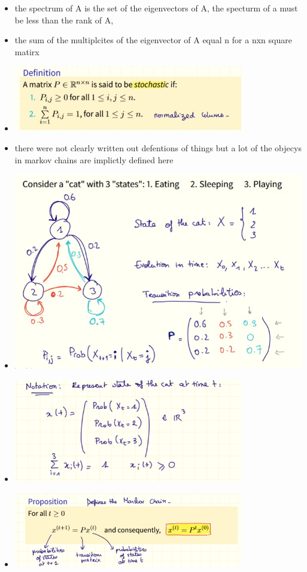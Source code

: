 \documentclass[12pt,twoside]{article}
\begin{document}
\begin{itemize}
\item the spectrum of A is the set of the eigenvectors of A, the specturm of a must be less than the rank of A,
\item the sum of the multiplcites of the eigenvector of A equal n for a nxn square matirx 
\item \includegraphics[width=10cm]{final Review/stochastic def.jpg}
\item there were not clearly written out defentions of things but a lot of the objecys in markov chains are implictly defined here 
\item \includegraphics[width=15cm]{final Review/markov chain defentions .jpg}
\item \includegraphics[width=10cm]{final Review/state vector.jpg}
\item \includegraphics[width=10cm]{final Review/long term .jpg}

\end{itemize}
\end{document}
